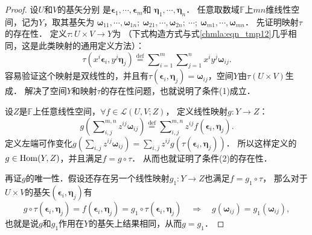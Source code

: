 \begin{proof}
    设$U$和$V$的基矢分别
    是$\boldsymbol{\epsilon}_1, \cdots, \boldsymbol{\epsilon}_m$和
    $\boldsymbol{\eta}_1, \cdots, \boldsymbol{\eta}_n$．
    任意取数域$\mathbb{F}$上$mn$维线性空间，记为$Y$，取其基矢为
    $\boldsymbol{\omega}_{11},  \cdots ,\boldsymbol{\omega}_{1n}; \
     \boldsymbol{\omega}_{21},  \cdots ,\boldsymbol{\omega}_{2n}; \  \cdots ;\ 
     \boldsymbol{\omega}_{m1}, \cdots ,\boldsymbol{\omega}_{mn}$．
    先证明映射$\tau$的存在性．    定义$\tau: U\times V \to Y$为
    （下式构造方式与式\eqref{chmla:eqn_tmp12}几乎相同，这是此类映射的通用定义方法）：
    \begin{equation}\label{chmla:eqn_tensorpruduct}
            \tau \left(x^i\boldsymbol{\epsilon}_i, y^j\boldsymbol{\eta}_j\right)
            \overset{\mathrm {def}}{=} \sum\nolimits_{i=1}^{m} \sum\nolimits_{j=1}^{n} x^i y^j \boldsymbol{\omega}_{ij} .
        \end{equation}
    容易验证这个映射是双线性的，并且有$\tau (\boldsymbol{\epsilon}_i, \boldsymbol{\eta}_j)
     = \boldsymbol{\omega}_{ij}$，空间$Y$由$\tau(U\times V)$生成．
    解决了空间$Y$和映射$\tau$的存在性问题，也就说明了条件(1)成立．



    设$Z$是$\mathbb{F}$上任意线性空间，$\forall f \in \mathscr{L}(U,V;Z)$，
    定义线性映射$g:Y \to Z$：
    \begin{equation}\label{chmla:eqn_fgtau}
            g \left(\sum\nolimits_{i,j}^{m,n} z^{ij}\boldsymbol{\omega}_{ij}\right)
            \overset{\mathrm {def}}{=} \sum\nolimits_{i,j}^{m,n} z^{ij} f(\boldsymbol{\epsilon}_i, \boldsymbol{\eta}_j) .
    \end{equation}
    定义左端可作变化$g(\sum_{i,j} z^{ij}\boldsymbol{\omega}_{ij})
    = \sum_{i,j} z^{ij} g(\tau (\boldsymbol{\epsilon}_i, \boldsymbol{\eta}_j)  ) $．
    所以这样定义的$g\in {\rm Hom}(Y,Z)$，并且满足$f=g\circ \tau$．
    从而也就证明了条件(2)的存在性．

    再证$g$的唯一性．假设还存在另一个线性映射$g_1:Y\to Z$也满足$f=g_1\circ \tau$，
    那么对于$U\times V$的基矢$(\boldsymbol{\epsilon}_i, \boldsymbol{\eta}_j)$有
    \begin{equation*}
        g\circ \tau(\boldsymbol{\epsilon}_i, \boldsymbol{\eta}_j) =
        f(\boldsymbol{\epsilon}_i, \boldsymbol{\eta}_j)=
        g_1\circ \tau(\boldsymbol{\epsilon}_i, \boldsymbol{\eta}_j)
        {\quad \Rightarrow \quad }
        g(\boldsymbol{\omega}_{ij})=g_1(\boldsymbol{\omega}_{ij}) ,
    \end{equation*}
    也就是说$g$和$g_1$作用在$Y$的基矢上结果相同，从而$g=g_1$．
\end{proof}


